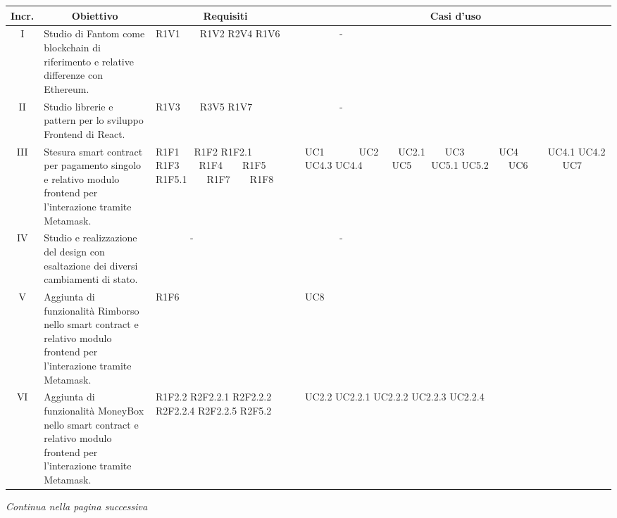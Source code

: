 \begin{table}[H]
  \centering
  \renewcommand{\arraystretch}{1.8}
  \begin{tabular}{c|p{6cm}|p{2cm}|p{2cm}}
    \rowcolor[HTML]{125E28}
    \color[HTML]{FFFFFF}\textbf{Incr.}
    & \multicolumn{1}{c}{\color[HTML]{FFFFFF}\textbf{Obiettivo}}
    & \multicolumn{1}{c}{\color[HTML]{FFFFFF}\textbf{Requisiti}}
    & \multicolumn{1}{c}{\color[HTML]{FFFFFF}\textbf{Casi d'uso}}\\
    \hline
    I	& Studio di Fantom\glo{} come blockchain\glo{} di riferimento e relative differenze con Ethereum\glo.	& R1V1\ \ \ \  R1V2 R2V4 R1V6 & \ \ \ \ \ \ \ - \\
    II & Studio librerie e pattern per lo sviluppo Frontend di React. & R1V3\ \ \ \  R3V5 R1V7 & \ \ \ \ \ \ \ - \\
    III	& Stesura smart contract per pagamento singolo e relativo modulo frontend per l'interazione tramite Metamask. & R1F1\ \ \  R1F2 R1F2.1 R1F3\ \ \ \ R1F4\ \ \ \  R1F5 R1F5.1\ \ \ \  R1F7\ \ \ \  R1F8 & UC1\ \ \ \ \ \ \ UC2\ \ \ \ UC2.1\ \ \ \   UC3\ \ \ \ \ \ \ UC4\ \ \ \ \ \ UC4.1 UC4.2 UC4.3 UC4.4\ \ \ \ \ \ UC5\ \ \ \ UC5.1 UC5.2\ \ \ \ UC6\ \ \ \ \ \ \  UC7 \\
    IV & Studio e realizzazione del design con esaltazione dei diversi cambiamenti di stato. & \ \ \ \ \ \ \ - & \ \ \ \ \ \ \ - \\
    V	& Aggiunta di funzionalità Rimborso nello smart contract e relativo modulo frontend per l'interazione tramite Metamask. & R1F6 & UC8 \\
    VI & Aggiunta di funzionalità MoneyBox nello smart contract e relativo modulo frontend per l'interazione tramite Metamask.  & R1F2.2 R2F2.2.1 R2F2.2.2 R2F2.2.4 R2F2.2.5 R2F5.2 & UC2.2 UC2.2.1 UC2.2.2 UC2.2.3 UC2.2.4 \\
  \end{tabular}
\end{table}
\begin{center}
  \textit{\small Continua nella pagina successiva}
\end{center}

